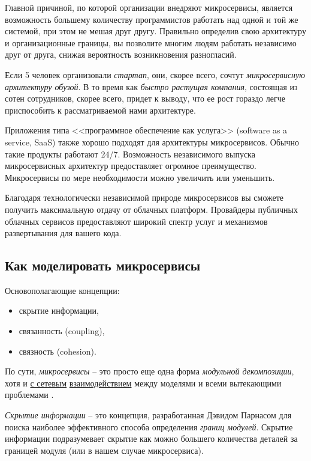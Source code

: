 \documentclass[%
	11pt,
	a4paper,
	utf8,
		]{article}
\begin{document}
Главной причиной, по которой организации внедряют микросервисы, является возможность большему количеству программистов работать над одной и той же системой, при этом не мешая друг другу. Правильно определив свою архитектуру и организационные границы, вы позволите многим людям работать независимо друг от друга, снижая вероятность возникновения разногласий.

Если 5 человек организовали \emph{стартап}, они, скорее всего, сочтут \emph{микросервисную архитектуру обузой}. В то время как \emph{быстро растущая компания}, состоящая из сотен сотрудников, скорее всего, придет к выводу, что ее рост гораздо легче приспособить к рассматриваемой нами архитектуре.

Приложения типа <<программное обеспечение как услуга>> (software as a service, SaaS) также хорошо подходят для архитектуры микросервисов. Обычно такие продукты работают 24/7. Возможность независимого выпуска микросервисных архитектур предоставляет огромное преимущество. Микросервисы по мере необходимости можно увеличить или уменьшить.

Благодаря технологически независимой природе микросервисов вы сможете получить максимальную отдачу от облачных платформ. Провайдеры публичных облачных сервисов предоставляют широкий спектр услуг и механизмов развертывания для вашего кода.

\subsection{Как моделировать микросервисы}

Основополагающие концепции:
\begin{itemize}
	\item скрытие информации,
	
	\item связанность (coupling),
	
	\item связность (cohesion).
\end{itemize}

По сути, \emph{микросервисы} -- это просто еще одна форма \emph{модульной декомпозиции}, хотя и \underline{с сетевым} \underline{взаимодействием} между моделями и всеми вытекающими проблемами \cite[]{microservices-2024}.

\emph{Скрытие информации} -- это концепция, разработанная Дэвидом Парнасом для поиска наиболее эффективного способа определения \emph{границ модулей}. Скрытие информации подразумевает скрытие как можно большего количества деталей за границей модуля (или в нашем случае микросервиса).
\end{document}
